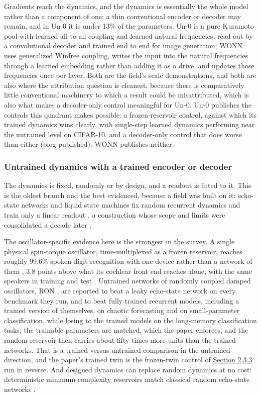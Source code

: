 \documentclass[10pt]{article}
\begin{document}
Gradients reach the dynamics, and the dynamics is essentially the whole
model rather than a component of one; a thin conventional encoder or
decoder may remain, and in Un-0 it is under 13\% of the parameters. Un-0
\citep{un-0} is a pure Kuramoto pool with learned all-to-all coupling
and learned natural frequencies, read out by a convolutional decoder and
trained end to end for image generation; WONN \citep{wonn} uses
generalized Winfree coupling, writes the input into the natural
frequencies through a learned embedding rather than adding it as a
drive, and updates those frequencies once per layer. Both are the
field's scale demonstrations, and both are also where the attribution
question is cleanest, because there is comparatively little conventional
machinery to which a result could be misattributed, which is also what
makes a decoder-only control meaningful for Un-0. Un-0 publishes the
controls this quadrant makes possible: a frozen-reservoir control,
against which its trained dynamics wins clearly, with single-step
learned dynamics performing near the untrained level on CIFAR-10, and a
decoder-only control that does worse than either (blog-published). WONN
publishes neither.

\subsubsection{Untrained dynamics with a trained encoder or
decoder}\label{sec-2-2-4}

The dynamics is fixed, randomly or by design, and a readout is fitted to
it. This is the oldest branch and the best evidenced, because a field
was built on it: echo-state networks and liquid state machines fix
random recurrent dynamics and train only a linear readout
\citep{jaeger2001, maass2002}, a construction whose scope and limits
were consolidated a decade later \citep{lukosevicius2009}.

The oscillator-specific evidence here is the strongest in the survey. A
single physical spin-torque oscillator, time-multiplexed as a frozen
reservoir, reaches roughly 99.6\% spoken-digit recognition with one
device rather than a network of them \citep{torrejon2017}, 3.8 points
above what its cochlear front end reaches alone, with the same speakers
in training and test \citep{abreu-araujo2020}. Untrained networks of
randomly coupled damped oscillators, RON \citep{ceni2024}, are reported
to beat a leaky echo-state network on every benchmark they run, and to
beat fully trained recurrent models, including a trained version of
themselves, on chaotic forecasting and on small-parameter
classification, while losing to the trained models on the long-memory
classification tasks; the trainable parameters are matched, which the
paper enforces, and the random reservoir then carries about fifty times
more units than the trained networks. That is a trained-versus-untrained
comparison in the untrained direction, and the paper's trained twin is
the frozen-twin control of \hyperref[sec-2-3-3]{Section 2.3.3} run in
reverse. And designed dynamics can replace random dynamics at no cost:
deterministic minimum-complexity reservoirs match classical random
echo-state networks \citep{rodan2011}.
\end{document}

